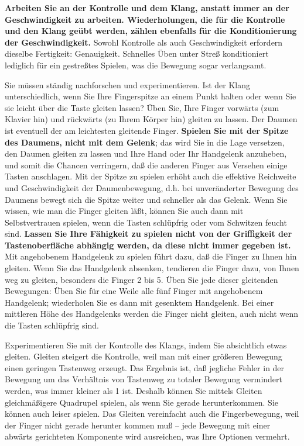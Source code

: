 \textbf{Arbeiten Sie an der Kontrolle und dem Klang, anstatt immer an der Geschwindigkeit zu arbeiten.
Wiederholungen, die für die Kontrolle und den Klang geübt werden, zählen ebenfalls für die Konditionierung der Geschwindigkeit.}
Sowohl Kontrolle als auch Geschwindigkeit erfordern dieselbe Fertigkeit: Genauigkeit.
Schnelles Üben unter Streß konditioniert lediglich für ein gestreßtes Spielen, was die Bewegung sogar verlangsamt.

Sie müssen ständig nachforschen und experimentieren.
Ist der Klang unterschiedlich, wenn Sie Ihre Fingerspitze an einem Punkt halten oder wenn Sie sie leicht über die Taste gleiten lassen?
Üben Sie, Ihre Finger vorwärts (zum Klavier hin) und rückwärts (zu Ihrem Körper hin) gleiten zu lassen.
Der Daumen ist eventuell der am leichtesten gleitende Finger.
\textbf{Spielen Sie mit der Spitze des Daumens, nicht mit dem Gelenk}; das wird Sie in die Lage versetzen, den Daumen gleiten zu lassen und Ihre Hand oder Ihr Handgelenk anzuheben, und somit die Chancen verringern, daß die anderen Finger aus Versehen einige Tasten anschlagen.
Mit der Spitze zu spielen erhöht auch die effektive Reichweite und Geschwindigkeit der Daumenbewegung, d.h. bei unveränderter Bewegung des Daumens bewegt sich die Spitze weiter und schneller als das Gelenk.
Wenn Sie wissen, wie man die Finger gleiten läßt, können Sie auch dann mit Selbstvertrauen spielen, wenn die Tasten schlüpfrig oder vom Schwitzen feucht sind.
\textbf{Lassen Sie Ihre Fähigkeit zu spielen nicht von der Griffigkeit der Tastenoberfläche abhängig werden, da diese nicht immer gegeben ist.}
Mit angehobenem Handgelenk zu spielen führt dazu, daß die Finger zu Ihnen hin gleiten.
Wenn Sie das Handgelenk absenken, tendieren die Finger dazu, von Ihnen weg zu gleiten, besonders die Finger 2 bis 5.
Üben Sie jede dieser gleitenden Bewegungen: Üben Sie für eine Weile alle fünf Finger mit angehobenem Handgelenk; wiederholen Sie es dann mit gesenktem Handgelenk.
Bei einer mittleren Höhe des Handgelenks werden die Finger nicht gleiten, auch nicht wenn die Tasten schlüpfrig sind.

Experimentieren Sie mit der Kontrolle des Klangs, indem Sie absichtlich etwas gleiten.
Gleiten steigert die Kontrolle, weil man mit einer größeren Bewegung einen geringen Tastenweg erzeugt.
Das Ergebnis ist, daß jegliche Fehler in der Bewegung um das Verhältnis von Tastenweg zu totaler Bewegung vermindert werden, was immer kleiner als 1 ist.
Deshalb können Sie mittels Gleiten gleichmäßigere Quadrupel spielen, als wenn Sie gerade herunterkommen.
Sie können auch leiser spielen.
Das Gleiten vereinfacht auch die Fingerbewegung, weil der Finger nicht gerade herunter kommen muß -- jede Bewegung mit einer abwärts gerichteten Komponente wird ausreichen, was Ihre Optionen vermehrt.

